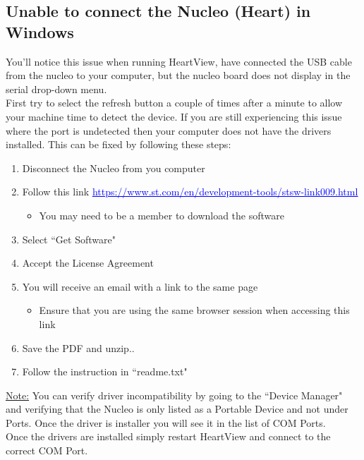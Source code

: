 \documentclass[11pt,fleqn]{book} %
\begin{document}
\subsection{Unable to connect the Nucleo (Heart) in Windows}

You'll notice this issue when running HeartView, have connected the USB cable from the nucleo to your computer, but the nucleo board does not display in the serial drop-down menu.\\

First try to select the refresh button a couple of times after a minute to allow your machine time to detect the device. If you are still experiencing this issue where the port is undetected then your computer does not have the drivers installed. This can be fixed by following these steps:\\

\begin{enumerate}
	\item Disconnect the Nucleo from you computer
	\item Follow this link \href{https://www.st.com/en/development-tools/stsw-link009.html}{\textcolor{blue}{\underline{https://www.st.com/en/development-tools/stsw-link009.html}}}
	\begin{itemize}
		\item You may need to be a member to download the software
	\end{itemize}
	\item Select ``Get Software"
	\item Accept the License Agreement
	\item You will receive an email with a link to the same page
	\begin{itemize}
		\item Ensure that you are using the same browser session when accessing this link
	\end{itemize}
	\item Save the PDF and unzip..
	\item Follow the instruction in ``readme.txt"\\
\end{enumerate}

\underline{Note:} You can verify driver incompatibility by going to the ``Device Manager" and verifying that the Nucleo is only listed as a Portable Device and not under Ports. Once the driver is installer you will see it in the list of COM Ports.\\

Once the drivers are installed simply restart HeartView and connect to the correct COM Port.
\end{document}
